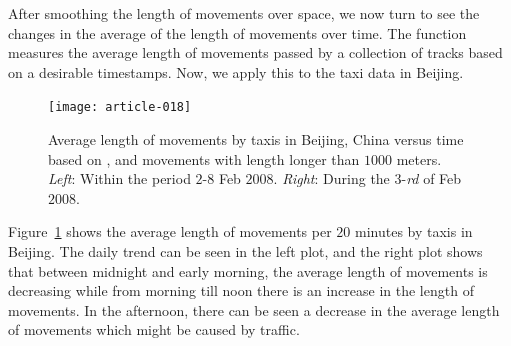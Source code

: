 \documentclass[article]{jss}
\begin{document}
 After smoothing the length of movements over space, we now turn to see the changes in the average of the length of movements over time. The function  measures the average length of movements passed by a collection of tracks based on a desirable timestamps. Now, we apply this to the taxi data in Beijing.
\begin{figure}[!h]
\begin{center}
\texttt{[image: article-018]}
\end{center}
\caption{Average length of movements by taxis in Beijing, China versus time based on , and movements with length longer than $1000$ meters. \emph{Left}: Within the period $2\text{-}8$ Feb $2008$. \emph{Right}: During the $3$-{\it rd} of Feb $2008$.}
\label{avemovebijing}
\end{figure}

Figure~\ref{avemovebijing} shows the average length of movements per $20$ minutes by taxis in Beijing. The daily trend can be seen in the left plot, and the right plot shows that between midnight and early morning, the average length of movements is decreasing while from morning till noon there is an increase in the length of movements. In the afternoon, there can be seen a decrease in the average length of movements which might be caused by traffic.
\end{document}
